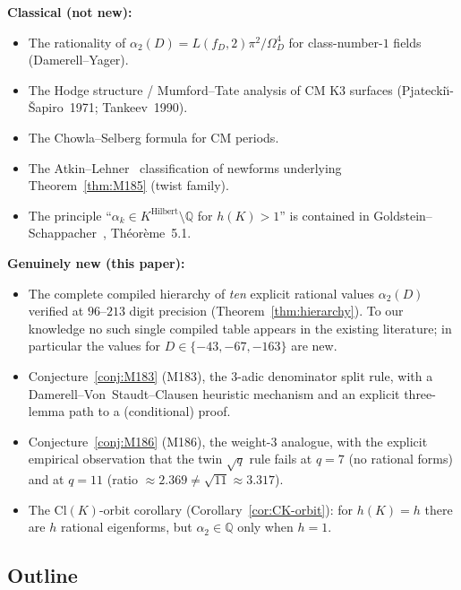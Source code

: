 \documentclass[12pt]{amsart}
\theoremstyle{definition}
\newcommand{\Q}{\mathbb{Q}}
\begin{document}
\medskip
\noindent\textbf{Classical (not new):}
\begin{itemize}[leftmargin=2em]
  \item The rationality of $\alpha_2(D) = L(f_D,2)\pi^2/\Omega_D^4$ for
        class-number-$1$ fields (Damerell--Yager).
  \item The Hodge structure / Mumford--Tate analysis of CM K3 surfaces
        (Pjatecki\u{\i}-\v{S}apiro~1971; Tankeev~1990).
  \item The Chowla--Selberg formula for CM periods.
  \item The Atkin--Lehner~\cite{CITE-NEEDED-AtkinLehner1970} classification
        of newforms underlying Theorem~\ref{thm:M185} (twist family).
  \item The principle ``$\alpha_k \in K^{\mathrm{Hilbert}} \setminus \Q$
        for $h(K) > 1$'' is contained in
        Goldstein--Schappacher~\cite{GoldsteinSchappacher1981}, Th\'eor\`eme~5.1.
\end{itemize}

\medskip
\noindent\textbf{Genuinely new (this paper):}
\begin{itemize}[leftmargin=2em]
  \item The complete compiled hierarchy of \emph{ten} explicit rational
        values $\alpha_2(D)$ verified at $96$--$213$ digit precision
        (Theorem~\ref{thm:hierarchy}). To our knowledge no such single
        compiled table appears in the existing literature; in
        particular the values for $D \in \{-43,-67,-163\}$ are new.
  \item Conjecture~\ref{conj:M183} (M183), the $3$-adic denominator split
        rule, with a Damerell--Von~Staudt--Clausen heuristic mechanism and
        an explicit three-lemma path to a (conditional) proof.
  \item Conjecture~\ref{conj:M186} (M186), the weight-$3$ analogue, with
        the explicit empirical observation that the twin
        $\sqrt{q}$ rule fails at $q = 7$ (no rational forms) and at
        $q = 11$ (ratio $\approx 2.369 \neq \sqrt{11} \approx 3.317$).
  \item The Cl$(K)$-orbit corollary
        (Corollary~\ref{cor:CK-orbit}): for $h(K) = h$ there are
        $h$ rational eigenforms, but $\alpha_2 \in \Q$ only when $h = 1$.
\end{itemize}

\subsection{Outline}
\end{document}
